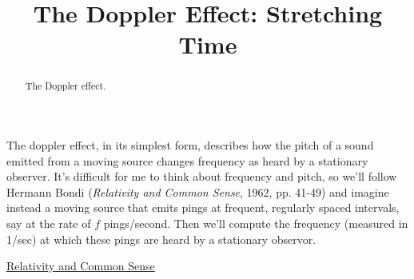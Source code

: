 \documentclass{ximera}
\title{The Doppler Effect: Stretching Time}
\begin{document}
\begin{abstract}
The Doppler effect.
\end{abstract}
\maketitle

The doppler effect, in its simplest form, describes how the pitch of a sound emitted from a moving source changes frequency as heard by a stationary observer. It's difficult for me to think about frequency and pitch, so we'll follow Hermann Bondi (\emph{Relativity and Common Sense}, 1962, pp. 41-49) and imagine instead a moving source that emits pings at frequent, regularly spaced intervals, say at the rate of $f$ pings/second. Then we'll compute the frequency (measured in 1/sec) at which these pings are heard by a stationary observor.

\href{https://ia801502.us.archive.org/15/items/in.ernet.dli.2015.62059/2015.62059.Relativity-And-Common-Sense.pdf}{Relativity and Common Sense}
\end{document}
